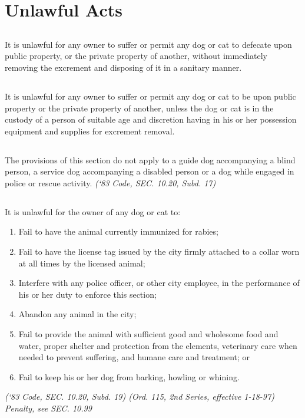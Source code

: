 \documentclass[code.tex]{subfiles}
\begin{document}
\section{Unlawful Acts}
\subsection{}
It is unlawful for any owner to suffer or permit any dog or cat to defecate upon public property, or the private property of another, without immediately removing the excrement and disposing of it in a sanitary manner.
\subsection{}
It is unlawful for any owner to suffer or permit any dog or cat to be upon public property or the private property of another, unless the dog or cat is in the custody of a person of suitable age and discretion having in his or her possession equipment and supplies for excrement removal.
\subsection{}
The provisions of this section do not apply to a guide dog accompanying a blind person, a service dog accompanying a disabled person or a dog while engaged in police or rescue activity. \emph{(‘83 Code, SEC. 10.20, Subd. 17)}
\subsection{}
It is unlawful for the owner of any dog or cat to:
\begin{enumerate}[{\indent}1)]
\item Fail to have the animal currently immunized for rabies;
\item Fail to have the license tag issued by the city firmly attached to a collar worn at all times by the licensed animal;
\item Interfere with any police officer, or other city employee, in the performance of his or her duty to enforce this section;
\item Abandon any animal in the city;
\item Fail to provide the animal with sufficient good and wholesome food and water, proper shelter and protection from the elements, veterinary care when needed to prevent suffering, and humane care and treatment; or 
\item Fail to keep his or her dog from barking, howling or whining.
\end{enumerate}
\emph{(‘83 Code, SEC. 10.20, Subd. 19)  (Ord. 115, 2nd Series, effective 1-18-97)  Penalty, see SEC. 10.99}
\end{document}
